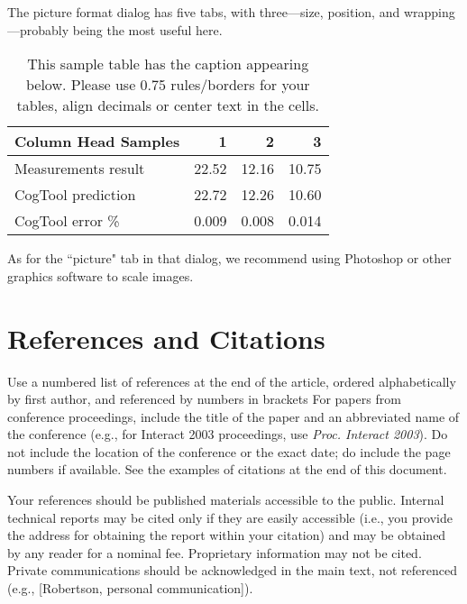 \documentclass{sigchi-ext}
\newcommand\tabhead[1]{\textbf{#1}}
\begin{document}
The picture format dialog has five tabs, with three---size, position, and wrapping---probably being the most useful here.

\begin{table}
\centering
	\begin{tabular}{|l|r|r|r|}
	\hline
	\tabhead{Column Head Samples} & \tabhead{1} & \tabhead{2} & \tabhead{3} \\
	\hline
	Measurements result & 22.52 & 12.16 & 10.75 \\\hline
	CogTool prediction & 22.72 & 12.26 & 10.60 \\\hline
	CogTool error \% & 0.009 & 0.008 & 0.014 \\\hline
	\end{tabular}
	\caption{This sample table has the caption appearing below.
	Please use 0.75 rules/borders for your tables, align decimals or
	center text in the cells.}\label{tab:sample}
\end{table}

As for the ``picture" tab in that dialog, we recommend using Photoshop or other graphics software to scale images.

\section{References and Citations}
Use a numbered list of references at the end of the article, ordered alphabetically by first author, and referenced by numbers in brackets \cite{Anderson92,Klemmer02,Mather00,Zellweger01}
For papers from conference proceedings, include the title of the paper and an abbreviated name of the conference (e.g., for Interact 2003 proceedings, use \emph{Proc. Interact 2003}). 
Do not include the location of the conference or the exact date; do include the page numbers if available. 
See the examples of citations at the end of this document. 

Your references should be published materials accessible to the public.  
Internal technical reports may be cited only if they are easily accessible (i.e., you provide the address for obtaining the report within your citation) and may be obtained by any reader for a nominal fee.  
Proprietary information may not be cited. 
Private communications should be acknowledged in the main text, not referenced  (e.g., [Robertson, personal communication]).
\end{document}
